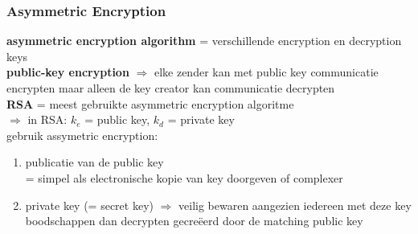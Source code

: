 \documentclass{report}
\begin{document}
\subsubsection{Asymmetric Encryption}
\textbf{asymmetric encryption algorithm} = verschillende encryption en decryption keys
\\\textbf{public-key encryption} $\Rightarrow$ elke zender kan met public key communicatie encrypten maar alleen de key creator kan communicatie decrypten
\\\textbf{RSA} = meest gebruikte asymmetric encryption algoritme
\\$\Rightarrow$ in RSA: $k_{e}$ = public key, $k_{d}$ = private key
\\gebruik assymetric encryption:
\begin{enumerate}
\item publicatie van de public key
\\= simpel als electronische kopie van key doorgeven of complexer
\item private key (= secret key) $\Rightarrow$ veilig bewaren aangezien iedereen met deze key boodschappen dan decrypten gecre\"eerd door de matching public key 
\end{enumerate}
\end{document}
